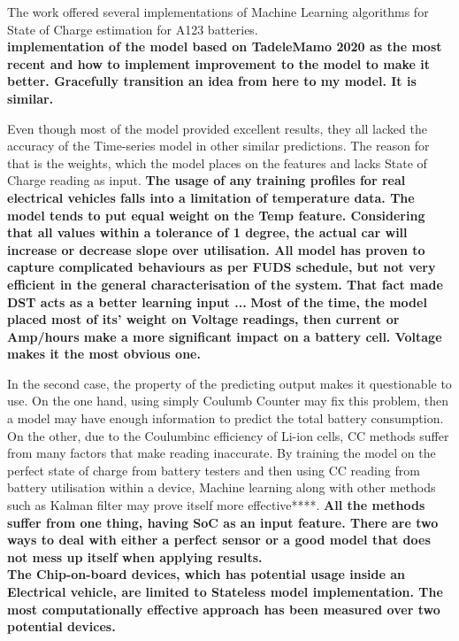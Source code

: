 The work offered several implementations of Machine Learning algorithms for State of Charge estimation for A123 batteries. \\ [2pc]

%
%
\textbf{implementation of the model based on TadeleMamo 2020 as the most recent and how to implement improvement to the model to make it better. Gracefully transition an idea from here to my model. It is similar.}

%
%
Even though most of the model provided excellent results, they all lacked the accuracy of the Time-series model in other similar predictions. The reason for that is the weights, which the model places on the features and lacks State of Charge reading as input. 
\textbf{The usage of any training profiles for real electrical vehicles falls into a limitation of temperature data. The model tends to put equal weight on the Temp feature. Considering that all values within a tolerance of 1 degree, the actual car will increase or decrease slope over utilisation. All model has proven to capture complicated behaviours as per FUDS schedule, but not very efficient in the general characterisation of the system. That fact made DST acts as a better learning input ...}
\textbf{Most of the time, the model placed most of its' weight on Voltage readings, then current or Amp/hours make a more significant impact on a battery cell. Voltage makes it the most obvious one.}

%
%
In the second case, the property of the predicting output makes it questionable to use.
On the one hand, using simply Coulumb Counter may fix this problem, then a model may have enough information to predict the total battery consumption.
On the other, due to the Coulumbinc efficiency of Li-ion cells, CC methods suffer from many factors that make reading inaccurate.
By training the model on the perfect state of charge from battery testers and then using CC reading from battery utilisation within a device, Machine learning along with other methods such as Kalman filter may prove itself more effective****.
\textbf{All the methods suffer from one thing, having SoC as an input feature. There are two ways to deal with either a perfect sensor or a good model that does not mess up itself when applying results.} \\
\textbf{The Chip-on-board devices, which has potential usage inside an Electrical vehicle, are limited to Stateless model implementation. The most computationally effective approach has been measured over two potential devices.}

